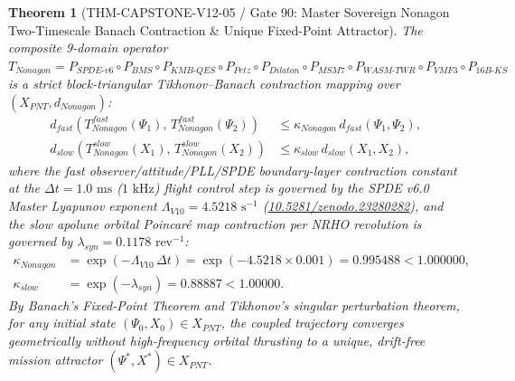 \documentclass[11pt,a4paper,reqno]{article}
\def\bm#1{#1}%
\def\texttt#1{#1}%
\def\mathrm#1{#1}%
\def\mathcal#1{#1}%
\newcommand{\zenodo}[1]{\href{https://doi.org/10.5281/zenodo.#1}{\texttt{10.5281/\allowbreak zenodo.#1}}}
\theoremstyle{plain}
\newtheorem{theorem}{Theorem}[section]
\theoremstyle{definition}
\theoremstyle{remark}
\numberwithin{equation}{section}
\begin{document}
\begin{theorem}[{\texttt{THM-CAPSTONE-V12-05} / Gate 90: Master Sovereign Nonagon Two-Timescale Banach Contraction \& Unique Fixed-Point Attractor}]
\label{thm:gate90_master_nonagon_contraction}
The composite 9-domain operator $\mathcal{T}_{\mathrm{Nonagon}} = \mathcal{P}_{\mathrm{SPDE\text{-}v6}} \circ \mathcal{P}_{\mathrm{BMS}} \circ \mathcal{P}_{\mathrm{KMB\text{-}QES}} \circ \mathcal{P}_{\mathrm{Petz}} \circ \mathcal{P}_{\mathrm{Dilaton}} \circ \mathcal{P}_{\mathrm{MSM7}} \circ \mathcal{P}_{\mathrm{WASM\text{-}TWR}} \circ \mathcal{P}_{\mathrm{VMF3}} \circ \mathcal{P}_{\mathrm{16B\text{-}KS}}$ is a strict block-triangular Tikhonov--Banach contraction mapping over $(\mathcal{X}_{\mathrm{PNT}}, d_{\mathrm{Nonagon}})$:
\begin{align}
\label{eq:nonagon_banach_contraction_fast}
  d_{\mathrm{fast}}\!\left(\mathcal{T}_{\mathrm{Nonagon}}^{\mathrm{fast}}(\bm{\Psi}_1),\, \mathcal{T}_{\mathrm{Nonagon}}^{\mathrm{fast}}(\bm{\Psi}_2)\right) &\le \kappa_{\mathrm{Nonagon}}\,d_{\mathrm{fast}}(\bm{\Psi}_1, \bm{\Psi}_2), \\[1ex]
\label{eq:nonagon_banach_contraction_slow}
  d_{\mathrm{slow}}\!\left(\mathcal{T}_{\mathrm{Nonagon}}^{\mathrm{slow}}(\bm{X}_1),\, \mathcal{T}_{\mathrm{Nonagon}}^{\mathrm{slow}}(\bm{X}_2)\right) &\le \kappa_{\mathrm{slow}}\,d_{\mathrm{slow}}(\bm{X}_1, \bm{X}_2),
\end{align}
where the fast observer/attitude/PLL/SPDE boundary-layer contraction constant at the $\Delta t = 1.0\text{ ms}$ ($1\text{ kHz}$) flight control step is governed by the SPDE v6.0 Master Lyapunov exponent $\Lambda_{\mathrm{V10}} = 4.5218\text{ s}^{-1}$ (\zenodo{23280282}), and the slow apolune orbital Poincar\'{e} map contraction per NRHO revolution is governed by $\lambda_{\mathrm{syn}} = 0.1178\text{ rev}^{-1}$:
\begin{align}
\label{eq:nonagon_contraction_constants}
  \kappa_{\mathrm{Nonagon}} &= \exp(-\Lambda_{\mathrm{V10}}\,\Delta t) = \exp(-4.5218 \times 0.001) = \bm{0.995488} < 1.000000, \\[1ex]
  \kappa_{\mathrm{slow}} &= \exp(-\lambda_{\mathrm{syn}}) = \bm{0.88887} < 1.00000.
\end{align}
By Banach's Fixed-Point Theorem and Tikhonov's singular perturbation theorem, for any initial state $(\bm{\Psi}_0, \bm{X}_0) \in \mathcal{X}_{\mathrm{PNT}}$, the coupled trajectory converges geometrically without high-frequency orbital thrusting to a unique, drift-free mission attractor $(\bm{\Psi}^*, \bm{X}^*) \in \mathcal{X}_{\mathrm{PNT}}$.
\end{theorem}
\end{document}
